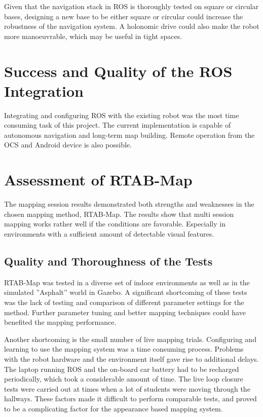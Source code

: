 Given that the navigation stack in \ac{ROS} is thoroughly tested on square or circular bases, designing a new base to be either square or circular could increase the robustness of the navigation system. A holonomic drive could also make the robot more manoeuvrable, which may be useful in tight spaces.

\section{Success and Quality of the ROS Integration}

Integrating and configuring \ac{ROS} with the existing robot was the most time consuming task of this project. The current implementation is capable of autonomous navigation and long-term map building. Remote operation from the \ac{OCS} and Android device is also possible. 



\section{Assessment of RTAB-Map}

The mapping session results demonstrated both strengths and weaknesses  in the chosen mapping method, \ac{RTAB-Map}. The results show that multi session mapping works rather well if the conditions are favorable. Especially in environments with a sufficient amount of detectable visual features. 

\subsection{Quality and Thoroughness of the Tests}

\ac{RTAB-Map} was tested in a diverse set of indoor environments as well as in the simulated ''Asphalt'' world in Gazebo. A significant shortcoming of these tests was the lack of testing and comparison of different parameter settings for the method. Further parameter tuning and better mapping techniques could have benefited the mapping performance.

Another shortcoming is the small number of live mapping trials. Configuring and learning to use the mapping system was a time consuming process. Problems with the robot hardware and the environment itself gave rise to additional delays. The laptop running \ac{ROS} and the on-board car battery had to be recharged periodically, which took a considerable amount of time. The live loop closure tests were carried out at times when a lot of students were moving through the hallways. These factors made it difficult to perform comparable tests, and proved to be a complicating factor for the appearance based mapping system. 

